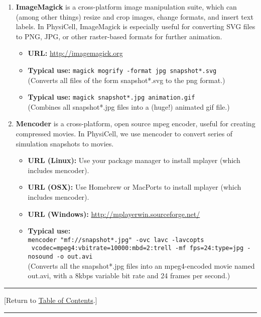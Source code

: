\documentclass[12pt]{article}
\renewcommand{\v}{\verb}
\newcommand{\TOClink}{\begin{center}\hrule\vskip-5pt\phantom{.}\hfill[Return to \hyperlink{TOC}{Table of Contents}.]\hfill\phantom{.}\vskip3pt\hrule\end{center}}
\begin{document}
\begin{enumerate}
\item 
\textbf{ImageMagick} is a cross-platform image manipulation suite, which can (among other things)
resize and crop images, change formats, and insert text labels. In PhysiCell, ImageMagick is especially 
useful for converting SVG files to PNG, JPG, or other raster-based formats for further animation. 

\begin{itemize}
\item\textbf{URL:} 
\href{http://imagemagick.org}{http://imagemagick.org} 
\item\textbf{Typical use:} \v|magick mogrify -format jpg snapshot*.svg| \\
\hspace{1in}(Converts all files of the form snapshot*.svg to the png format.)
\item\textbf{Typical use:} \v|magick snapshot*.jpg animation.gif| \\
\hspace{1in}(Combines all snapshot*.jpg files into a (huge!) animated gif file.)
\end{itemize}

\item 
\textbf{Mencoder} is a cross-platform, open source mpeg encoder, useful for creating compressed 
movies. In PhysiCell, we use mencoder to convert series of simulation snapshots to movies. 
\begin{itemize}
\item \textbf{URL (Linux):} Use your package manager to install mplayer (which includes mencoder). 
\item \textbf{URL (OSX):} Use Homebrew or MacPorts to install mplayer (which includes mencoder).
\item \textbf{URL (Windows):} \href{http://mplayerwin.sourceforge.net/}{http://mplayerwin.sourceforge.net/}
\item \textbf{Typical use:} \\
\normalsize\v|mencoder "mf://snapshot*.jpg" -ovc lavc -lavcopts| \\
\normalsize\v| vcodec=mpeg4:vbitrate=10000:mbd=2:trell -mf fps=24:type=jpg -nosound -o out.avi|\normalsize \\
\hspace{1in}(Converts all the snapshot*.jpg files into an mpeg4-encoded movie named out.avi, with a 8kbps variable bit rate and 24 frames per second.) 
\end{itemize}

\end{enumerate}
\TOClink
\end{document}
